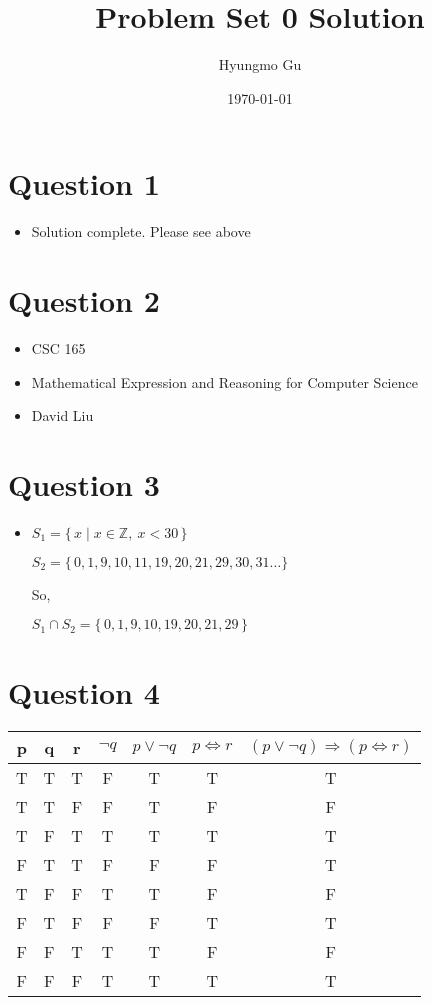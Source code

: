 \documentclass[12pt]{article}
\begin{document}
\title{Problem Set 0 Solution}
\author{Hyungmo Gu}
\date{\today}
\maketitle

\section*{Question 1}
    \begin{itemize}
        \item Solution complete. Please see above
    \end{itemize}

\section*{Question 2}
    \begin{itemize}
        \item CSC 165
        \item Mathematical Expression and Reasoning for Computer Science
        \item David Liu
    \end{itemize}

\section*{Question 3}
    \begin{itemize}
        \item
            $S_1 = \{\,x \mid x \in \mathbb{Z},\:x < 30\,\}$

            $S_2 = \{\,0, 1, 9, 10, 11, 19, 20, 21, 29, 30, 31 \dotsc\}$

            So,

            $S_1 \cap S_2 = \{\,0, 1, 9, 10, 19, 20, 21, 29\,\}$


    \end{itemize}


\section*{Question 4}
    \begin{tabular}{c | c | c | c | c | c | c}
        p & q & r & $\neg q$ & $p \lor \neg q $ & $p \iff r$ & $(p \lor \neg q) \Rightarrow (p \iff r)$ \\
        \hline
        T & T & T & F & T & T & T \\
        T & T & F & F & T & F & F \\
        T & F & T & T & T & T & T \\
        F & T & T & F & F & F & T \\
        T & F & F & T & T & F & F \\
        F & T & F & F & F & T & T \\
        F & F & T & T & T & F & F \\
        F & F & F & T & T & T & T \\
        \hline
    \end{tabular}
\end{document}
